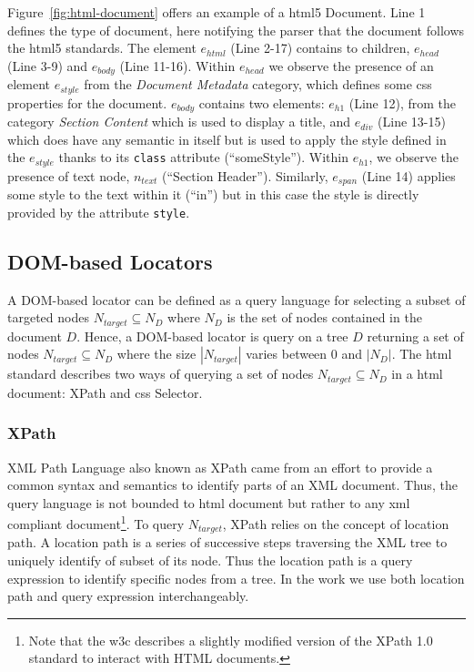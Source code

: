 Figure~\ref{fig:html-document} offers an example of a \gls{html}5 Document. Line 1 defines the type of document, here notifying the parser that the document follows the \gls{html}5 standards. The element $e_{html}$ (Line 2-17) contains to children, $e_{head}$ (Line 3-9) and $e_{body}$ (Line 11-16). Within $e_{head}$ we observe the presence of an element $e_{style}$ from the \emph{Document Metadata} category, which defines some \gls{css} properties for the document. $e_{body}$ contains two elements: $e_{h1}$ (Line 12), from the category \emph{Section Content} which is used to display a title, and $e_{div}$ (Line 13-15) which does have any semantic in itself but is used to apply the style defined in the $e_{style}$ thanks to its \texttt{class} attribute (``someStyle''). Within $e_{h1}$, we observe the presence of text node, $n_{text}$ (``Section Header''). Similarly, $e_{span}$ (Line 14) applies some style to the text within it (``in'') but in this case the style is directly provided by the attribute \texttt{style}.

\subsection{DOM-based Locators}
\label{sec:hpath-introduction-locators}

A DOM-based locator can be defined as a query language for selecting a subset of targeted nodes $N_{target} \subseteq N_D$ where $N_D$ is the set of nodes contained in the document $D$. Hence, a DOM-based locator is query on a tree $D$ returning a set of nodes $N_{target} \subseteq N_D$ where the size $|N_{target}|$ varies between 0 and $|N_D|$. The \gls{html} standard describes two ways of querying a set of nodes $N_{target} \subseteq N_D$ in a \gls{html} document: XPath and \gls{css} Selector. 

\subsubsection{XPath}
\label{sec:hpath-introduction-xpath}

XML Path Language also known as XPath came from an effort to provide a common syntax and semantics to identify parts of an XML document\cite{W3C2016}. Thus, the query language is not bounded to \gls{html} document but rather to any \gls{xml} compliant document\footnote{Note that the \gls{w3c} describes a slightly modified version of the XPath 1.0 standard to interact with HTML documents.}. To query $N_{target}$, XPath relies on the concept of location path. A location path\cite{Gottlob2002} is a series of successive steps traversing the XML tree to uniquely identify of subset of its node. Thus the location path is a query expression to identify specific nodes from a tree. In the work we use both location path and query expression interchangeably.

